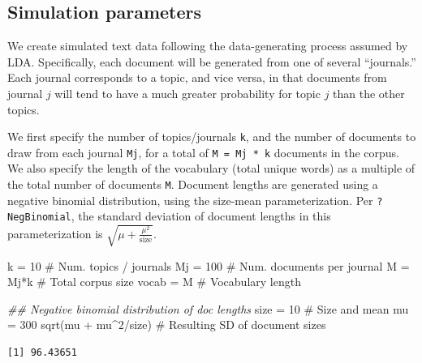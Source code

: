 \documentclass[
]{article}
\newenvironment{Shaded}{\begin{snugshade}}{\end{snugshade}}
\newcommand{\CommentTok}[1]{\textcolor[rgb]{0.37,0.37,0.37}{#1}}
\newcommand{\DecValTok}[1]{\textcolor[rgb]{0.68,0.00,0.00}{#1}}
\newcommand{\DocumentationTok}[1]{\textcolor[rgb]{0.37,0.37,0.37}{\textit{#1}}}
\newcommand{\FunctionTok}[1]{\textcolor[rgb]{0.28,0.35,0.67}{#1}}
\newcommand{\NormalTok}[1]{\textcolor[rgb]{0.00,0.23,0.31}{#1}}
\newcommand{\OtherTok}[1]{\textcolor[rgb]{0.00,0.23,0.31}{#1}}
\newcommand{\SpecialCharTok}[1]{\textcolor[rgb]{0.37,0.37,0.37}{#1}}
\begin{document}
\hypertarget{simulation-parameters}{%
\subsection{Simulation parameters}\label{simulation-parameters}}

We create simulated text data following the data-generating process
assumed by LDA. Specifically, each document will be generated from one
of several ``journals.'' Each journal corresponds to a topic, and vice
versa, in that documents from journal \(j\) will tend to have a much
greater probability for topic \(j\) than the other topics.

We first specify the number of topics/journals \texttt{k}, and the
number of documents to draw from each journal \texttt{Mj}, for a total
of \texttt{M\ =\ Mj\ *\ k} documents in the corpus. We also specify the
length of the vocabulary (total unique words) as a multiple of the total
number of documents \texttt{M}. Document lengths are generated using a
negative binomial distribution, using the size-mean parameterization.
Per \texttt{?NegBinomial}, the standard deviation of document lengths in
this parameterization is \(\sqrt{\mu + \frac{\mu^2}{\mathrm{size}}}\).

\begin{Shaded}
\begin{Highlighting}[]
\NormalTok{k }\OtherTok{=} \DecValTok{10}                \CommentTok{\# Num. topics / journals}
\NormalTok{Mj }\OtherTok{=} \DecValTok{100}              \CommentTok{\# Num. documents per journal}
\NormalTok{M }\OtherTok{=}\NormalTok{ Mj}\SpecialCharTok{*}\NormalTok{k              }\CommentTok{\# Total corpus size}
\NormalTok{vocab }\OtherTok{=}\NormalTok{ M             }\CommentTok{\# Vocabulary length}

\DocumentationTok{\#\# Negative binomial distribution of doc lengths}
\NormalTok{size }\OtherTok{=} \DecValTok{10}             \CommentTok{\# Size and mean}
\NormalTok{mu }\OtherTok{=} \DecValTok{300}
\FunctionTok{sqrt}\NormalTok{(mu }\SpecialCharTok{+}\NormalTok{ mu}\SpecialCharTok{\^{}}\DecValTok{2}\SpecialCharTok{/}\NormalTok{size)  }\CommentTok{\# Resulting SD of document sizes}
\end{Highlighting}
\end{Shaded}

\begin{verbatim}
[1] 96.43651
\end{verbatim}
\end{document}
